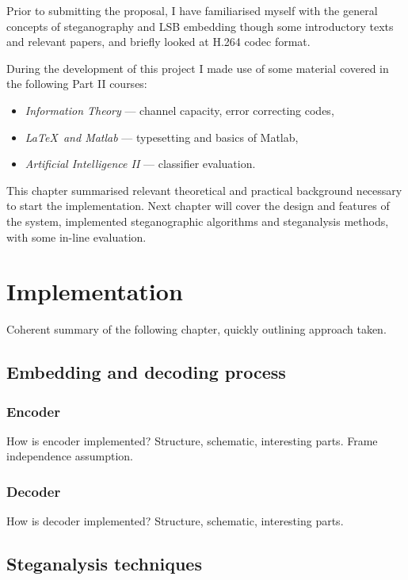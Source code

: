 \documentclass[12pt,british,twoside,notitlepage,usenames,dvipsnames,hypens,final]{report}
\numberwithin{equation}{section}
\numberwithin{figure}{section}
\begin{document}
Prior to submitting the proposal, I have familiarised myself with the general concepts of steganography and LSB embedding though some introductory texts and relevant papers, and briefly looked at H.264 codec format.

During the development of this project I made use of some material covered in the following Part II courses:
\begin{itemize}
\item \textit{Information Theory} --- channel capacity, error correcting codes,
\item \textit{\LaTeX~and Matlab} --- typesetting and basics of Matlab,
\item \textit{Artificial Intelligence II} --- classifier evaluation.
\end{itemize}

\bigskip
This chapter summarised relevant theoretical and practical background necessary to start the implementation. Next chapter will cover the design and features of the system, implemented steganographic algorithms and steganalysis methods, with some in-line evaluation.

\cleardoublepage
\chapter{Implementation}

Coherent summary of the following chapter, quickly outlining approach taken.

\section{Embedding and decoding process}

\subsection{Encoder}

How is encoder implemented? Structure, schematic, interesting parts.  Frame independence assumption.

\subsection{Decoder}

How is decoder implemented? Structure, schematic, interesting parts. 

\section{Steganalysis techniques}
\end{document}
